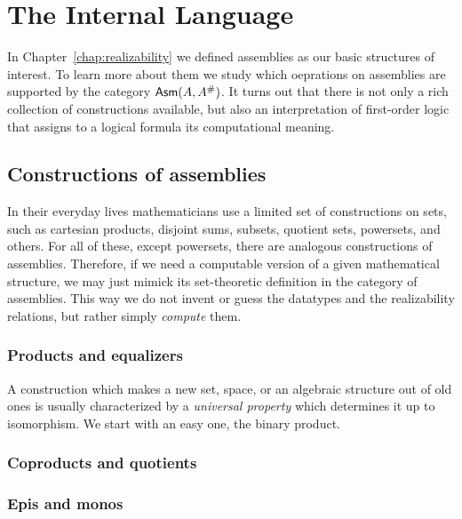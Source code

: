 \chapter{The Internal Language}
\label{chap:internal-language}

In Chapter~\ref{chap:realizability} we defined assemblies as our basic
structures of interest. To learn more about them we study which
oeprations on assemblies are supported by the category $\mathsf{Asm}(A,
  A^{\#})$. It turns out that there is not only a rich collection of
constructions available, but also an interpretation of first-order
logic that assigns to a logical formula its computational meaning.

\section{Constructions of assemblies}
\label{sec:constructions}

In their everyday lives mathematicians use a limited set of
constructions on sets, such as cartesian products, disjoint sums,
subsets, quotient sets, powersets, and others. For all of these,
except powersets, there are analogous constructions of assemblies.
Therefore, if we need a computable version of a given mathematical
structure, we may just mimick its set-theoretic definition in the
category of assemblies. This way we do not invent or guess the
datatypes and the realizability relations, but rather simply
\emph{compute} them.

\subsection{Products and equalizers}
\label{sec:products-equalizers}

A construction which makes a new set, space, or an algebraic structure
out of old ones is usually characterized by a \emph{universal
  property} which determines it up to isomorphism. We start with an
easy one, the binary product.



\subsection{Coproducts and quotients}
\label{sec:products-equalizers}


\subsection{Epis and monos}
\label{sec:epis-monos}

